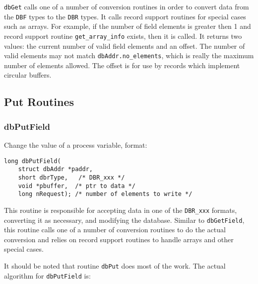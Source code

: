 \verb|dbGet| calls one of a number of conversion routines in order to convert data from the \verb|DBF| types to the \verb|DBR| types. It calls 
record support routines for special cases such as arrays. For example, if the number of field elements is greater then 1 and 
record support routine \verb|get_array_info| exists, then it is called. It returns two values: the current number of valid field 
elements and an offset. The number of valid elements may not match \verb|dbAddr.no_elements|, which is really the 
maximum number of elements allowed. The offset is for use by records which implement circular buffers.

\subsection{Put Routines}

\subsubsection{dbPutField}

Change the value of a process variable, format:

\begin{verbatim}
long dbPutField(
    struct dbAddr *paddr,
    short dbrType,   /* DBR_xxx */
    void *pbuffer,  /* ptr to data */
    long nRequest); /* number of elements to write */
\end{verbatim}

This routine is responsible for accepting data in one of the \verb|DBR_xxx| formats, converting it as necessary, and modifying 
the database. Similar to \verb|dbGetField|, this routine calls one of a number of conversion routines to do the actual 
conversion and relies on record support routines to handle arrays and other special cases.

It should be noted that routine \verb|dbPut| does most of the work. The actual algorithm for \verb|dbPutField| is:

